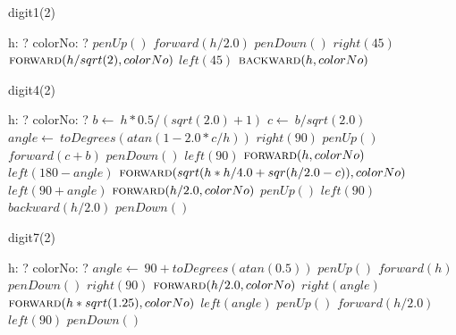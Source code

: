 \documentclass[a4paper,10pt]{article}
\begin{document}
\begin{algorithm}
\caption{digit1(2)}
\begin{algorithmic}[5]
\State {}
\State {}
    \State h: ?
    \State colorNo: ?
  \EndDecl
  \State \(penUp()\)
  \State \(forward(h/2.0)\)
  \State \(penDown()\)
  \State \(right(45)\)
  \State \(\Call{forward}{h/sqrt(2),colorNo}\)
  \State \(left(45)\)
  \State \(\Call{backward}{h,colorNo}\)
\EndProcedure
\end{algorithmic}
\end{algorithm}


\begin{algorithm}
\caption{digit4(2)}
\begin{algorithmic}[5]
\State {}
\State {}
    \State h: ?
    \State colorNo: ?
  \EndDecl
  \State \(b\gets\ h*0.5/(sqrt(2.0)+1)\)
  \State \(c\gets\ b/sqrt(2.0)\)
  \State \(angle\gets\ toDegrees(atan(1-2.0*c/h))\)
  \State \(right(90)\)
  \State \(penUp()\)
  \State \(forward(c+b)\)
  \State \(penDown()\)
  \State \(left(90)\)
  \State \(\Call{forward}{h,colorNo}\)
  \State \(left(180-angle)\)
  \State \(\Call{forward}{sqrt(h*h/4.0+sqr(h/2.0-c)),colorNo}\)
  \State \(left(90+angle)\)
  \State \(\Call{forward}{h/2.0,colorNo}\)
  \State \(penUp()\)
  \State \(left(90)\)
  \State \(backward(h/2.0)\)
  \State \(penDown()\)
\EndProcedure
\end{algorithmic}
\end{algorithm}


\begin{algorithm}
\caption{digit7(2)}
\begin{algorithmic}[5]
\State {}
\State {}
    \State h: ?
    \State colorNo: ?
  \EndDecl
  \State \(angle\gets\ 90+toDegrees(atan(0.5))\)
  \State \(penUp()\)
  \State \(forward(h)\)
  \State \(penDown()\)
  \State \(right(90)\)
  \State \(\Call{forward}{h/2.0,colorNo}\)
  \State \(right(angle)\)
  \State \(\Call{forward}{h*sqrt(1.25),colorNo}\)
  \State \(left(angle)\)
  \State \(penUp()\)
  \State \(forward(h/2.0)\)
  \State \(left(90)\)
  \State \(penDown()\)
\EndProcedure
\end{algorithmic}
\end{algorithm}
\end{document}
